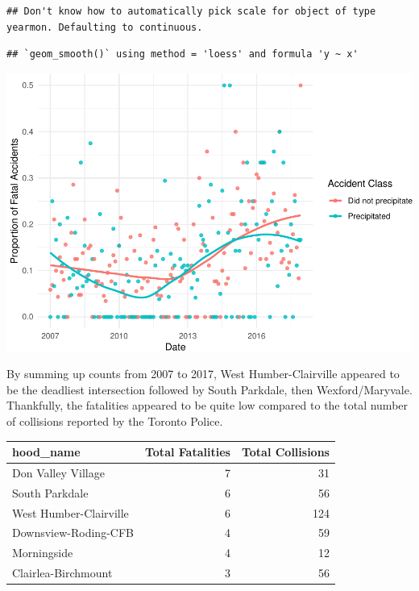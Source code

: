 \documentclass[]{article}
\begin{document}
\begin{verbatim}
## Don't know how to automatically pick scale for object of type yearmon. Defaulting to continuous.
\end{verbatim}

\begin{verbatim}
## `geom_smooth()` using method = 'loess' and formula 'y ~ x'
\end{verbatim}

\includegraphics{Project_II-Final-20190404_files/figure-latex/unnamed-chunk-7-2.pdf}

By summing up counts from 2007 to 2017, West Humber-Clairville appeared
to be the deadliest intersection followed by South Parkdale, then
Wexford/Maryvale. Thankfully, the fatalities appeared to be quite low
compared to the total number of collisions reported by the Toronto
Police.

\begin{table}[H]
\centering
\begin{tabular}{l|r|r}
\hline
hood\_name & Total Fatalities & Total Collisions\\
\hline
Don Valley Village & 7 & 31\\
\hline
South Parkdale & 6 & 56\\
\hline
West Humber-Clairville & 6 & 124\\
\hline
Downsview-Roding-CFB & 4 & 59\\
\hline
Morningside & 4 & 12\\
\hline
Clairlea-Birchmount & 3 & 56\\
\hline
\end{tabular}
\end{table}
\end{document}
